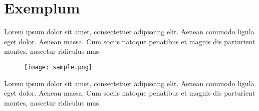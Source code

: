 \documentclass[12pt,halfparskip,BCOR0pt,DIV12]{scrartcl}
\numberwithin{figure}{section}
\begin{document}
\section{Exemplum}
Lorem ipsum dolor sit amet, consectetuer adipiscing elit. Aenean commodo ligula eget dolor. Aenean massa. Cum sociis natoque penatibus et magnis dis parturient montes, nascetur ridiculus mus.
\begin{figure}[h]
\texttt{[image: sample.png]}
  \captionsetup{skip=0pt}
  \label{fig:Q-pd}
\end{figure}

Lorem ipsum dolor sit amet, consectetuer adipiscing elit. Aenean commodo ligula eget dolor. Aenean massa. Cum sociis natoque penatibus et magnis dis parturient montes, nascetur ridiculus mus.
\end{document}

